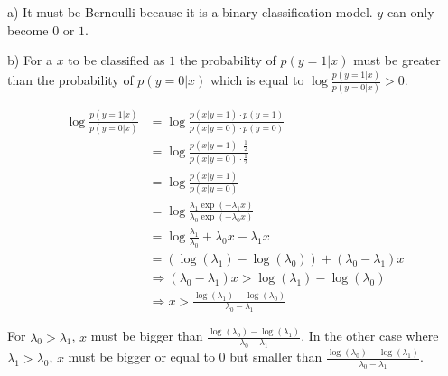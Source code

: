 

\newcommand{\ExerciseNumber}{01}

\newcommand{\PersonOne}{Marcel Bruckner (03674122)}
\newcommand{\PersonTwo}{Julian Hohenadel (03673879)}
\newcommand{\PersonThree}{Kevin Bein (03707775)}






%
%
%
\begin{flushleft}
a) It must be Bernoulli because it is a binary classification model. $y$ can only become $0$ or $1$.
\end{flushleft}
\begin{flushleft}
b) For a $x$ to be classified as $1$ the probability of $p(y=1|x)$ must be greater than the probability of $p(y=0|x)$ which is equal to $\log \frac{p(y=1|x)}{p(y=0|x)} > 0$.
\end{flushleft}
\begin{align*}
  \log \frac{p(y=1|x)}{p(y=0|x)} &= \log \frac{p(x|y=1)\cdot p(y=1)}{p(x|y=0)\cdot p(y=0)} \\
  &= \log \frac{p(x|y=1)\cdot \frac{1}{2}}{p(x|y=0)\cdot \frac{1}{2}} \\
  &= \log \frac{p(x|y=1)}{p(x|y=0)} \\
  &= \log \frac{\lambda_1 \exp(-\lambda_1 x)}{\lambda_0 \exp(-\lambda_0 x)} \\
  &= \log \frac{\lambda_1}{\lambda_0} + \lambda_0 x - \lambda_1x \\
  &= (\log(\lambda_1) - \log(\lambda_0)) + (\lambda_0 - \lambda_1)x \\
  &\Rightarrow (\lambda_0 - \lambda_1)x > \log(\lambda_1) - \log(\lambda_0) \\
  &\Rightarrow x > \frac{\log(\lambda_1) - \log(\lambda_0)}{\lambda_0 - \lambda_1}
\end{align*}
\begin{flushleft}
For $\lambda_0 > \lambda_1$, $x$ must be bigger than $\frac{\log(\lambda_0) - \log(\lambda_1)}{\lambda_0 - \lambda_1}$. In the other case where $\lambda_1 > \lambda_0$, $x$ must be bigger or equal to 0 but smaller than $\frac{\log(\lambda_0) - \log(\lambda_1)}{\lambda_0 - \lambda_1}$.
\end{flushleft}
%
%
%
%
%
%


